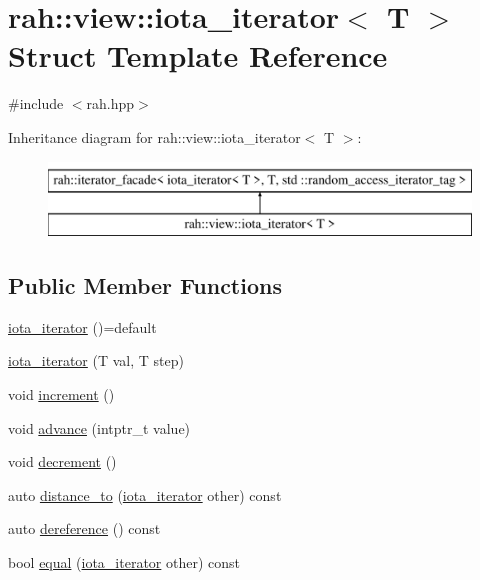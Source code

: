 \hypertarget{structrah_1_1view_1_1iota__iterator}{}\section{rah\+::view\+::iota\+\_\+iterator$<$ T $>$ Struct Template Reference}
\label{structrah_1_1view_1_1iota__iterator}


{\ttfamily \#include $<$rah.\+hpp$>$}

Inheritance diagram for rah\+::view\+::iota\+\_\+iterator$<$ T $>$\+:\begin{figure}[H]
\begin{center}
\leavevmode
\includegraphics[height=2.000000cm]{structrah_1_1view_1_1iota__iterator}
\end{center}
\end{figure}
\subsection*{Public Member Functions}
\begin{DoxyCompactItemize}
\item 
\mbox{\hyperlink{structrah_1_1view_1_1iota__iterator_ac6bb0b67f8d778854c3cb25aec3e9160}{iota\+\_\+iterator}} ()=default
\item 
\mbox{\hyperlink{structrah_1_1view_1_1iota__iterator_a7807733a9a9609f8b9652e270551dc9b}{iota\+\_\+iterator}} (T val, T step)
\item 
void \mbox{\hyperlink{structrah_1_1view_1_1iota__iterator_a52be6587654c9783137bf31d800f315d}{increment}} ()
\item 
void \mbox{\hyperlink{structrah_1_1view_1_1iota__iterator_afdc7732c688daecb60d17b45a678e1f1}{advance}} (intptr\+\_\+t value)
\item 
void \mbox{\hyperlink{structrah_1_1view_1_1iota__iterator_ab11421ab7ec8d986bdf7ef5f930d0b43}{decrement}} ()
\item 
auto \mbox{\hyperlink{structrah_1_1view_1_1iota__iterator_a3662abe8721e4c5c7bbc4214e36c4920}{distance\+\_\+to}} (\mbox{\hyperlink{structrah_1_1view_1_1iota__iterator}{iota\+\_\+iterator}} other) const
\item 
auto \mbox{\hyperlink{structrah_1_1view_1_1iota__iterator_ae31c733c52f77c7c199802db6638541d}{dereference}} () const
\item 
bool \mbox{\hyperlink{structrah_1_1view_1_1iota__iterator_ada1691e363efa9b5c945a302296e63d5}{equal}} (\mbox{\hyperlink{structrah_1_1view_1_1iota__iterator}{iota\+\_\+iterator}} other) const
\end{DoxyCompactItemize}
